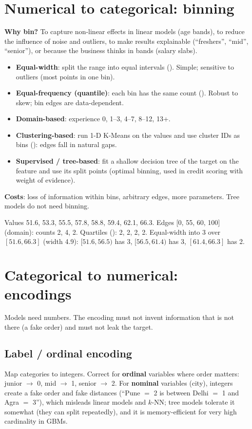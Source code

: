 \section{Numerical to categorical: binning}
\textbf{Why bin?} To capture non-linear effects in linear models (age bands), to reduce the influence of noise and outliers, to make results explainable
(``freshers'', ``mid'', ``senior''), or because the business thinks in bands (salary slabs).
\begin{itemize}
\item \textbf{Equal-width}: split the range into equal intervals (). Simple; sensitive to outliers (most points in one bin).
\item \textbf{Equal-frequency (quantile)}: each bin has the same count (). Robust to skew; bin edges are data-dependent.
\item \textbf{Domain-based}: experience 0, 1--3, 4--7, 8--12, 13+.
\item \textbf{Clustering-based}: run 1-D K-Means on the values and use cluster IDs as bins (): edges fall in natural gaps.
\item \textbf{Supervised / tree-based}: fit a shallow decision tree of the target on the feature and use its split points (optimal binning, used in credit scoring with
  weight of evidence).
\end{itemize}
\textbf{Costs}: loss of information within bins, arbitrary edges, more parameters. Tree models do not need binning.
\begin{example}
Values 51.6, 53.3, 55.5, 57.8, 58.8, 59.4, 62.1, 66.3. Edges [0, 55, 60, 100] (domain): counts 2, 4, 2. Quartiles (): 2, 2, 2, 2.
Equal-width into 3 over $[51.6, 66.3]$ (width 4.9): $[51.6, 56.5)$ has 3, $[56.5, 61.4)$ has 3, $[61.4, 66.3]$ has 2.
\end{example}

\section{Categorical to numerical: encodings}
Models need numbers. The encoding must not invent information that is not there (a fake order) and must not leak the target.

\subsection{Label / ordinal encoding}
Map categories to integers. Correct for \textbf{ordinal} variables where order matters: junior $\to$ 0, mid $\to$ 1, senior $\to$ 2. For \textbf{nominal} variables
(city), integers create a fake order and fake distances (``Pune $=$ 2 is between Delhi $=$ 1 and Agra $=$ 3''), which misleads linear models and $k$-NN; tree models
tolerate it somewhat (they can split repeatedly), and it is memory-efficient for very high cardinality in GBMs.

